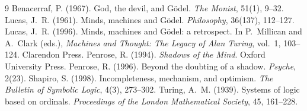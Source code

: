 \documentclass{situationist-preprint}
\begin{document}
\begin{thebibliography}{9}\small
{} Benacerraf, P. (1967). God, the devil, and G\"odel. \emph{The Monist}, 51(1), 9--32.
 Lucas, J.~R. (1961). Minds, machines and G\"odel. \emph{Philosophy}, 36(137), 112--127.
 Lucas, J.~R. (1996). Minds, machines and G\"odel: a retrospect. In P.~Millican and A.~Clark (eds.), \emph{Machines and Thought: The Legacy of Alan Turing}, vol.~1, 103--124. Clarendon Press.
 Penrose, R. (1994). \emph{Shadows of the Mind}. Oxford University Press.
 Penrose, R. (1996). Beyond the doubting of a shadow. \emph{Psyche}, 2(23).
 Shapiro, S. (1998). Incompleteness, mechanism, and optimism. \emph{The Bulletin of Symbolic Logic}, 4(3), 273--302.
 Turing, A.~M. (1939). Systems of logic based on ordinals. \emph{Proceedings of the London Mathematical Society}, 45, 161--228.
\end{thebibliography}
\end{document}
